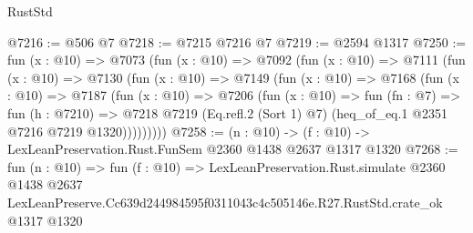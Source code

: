 \begin{lexlean}{RustStd}
\begin{coremodule}
@7216 := @506 @7
@7218 := @7215 @7216 @7
@7219 := @2594 @1317
@7250 := fun (x : @10) =>
  @7073
    (fun (x : @10) =>
    @7092
      (fun (x : @10) =>
      @7111
        (fun (x : @10) =>
        @7130
          (fun (x : @10) =>
          @7149
            (fun (x : @10) =>
            @7168
              (fun (x : @10) =>
              @7187
                (fun (x : @10) =>
                @7206
                  (fun (x : @10) =>
                  fun (fn : @7) =>
                  fun (h : @7210) =>
                  @7218
                    @7219
                    (Eq.refl.{2} (Sort 1) @7)
                    (heq_of_eq.{1} @2351 @7216 @7219 @1320)))))))))
@7258 := (n : @10) -> (f : @10) -> LexLeanPreservation.Rust.FunSem @2360 @1438 @2637 @1317 @1320
@7268 := fun (n : @10) =>
  fun (f : @10) =>
  LexLeanPreservation.Rust.simulate
    @2360
    @1438
    @2637
    LexLeanPreserve.Cc639d244984595f0311043c4c505146e.R27.RustStd.crate_ok
    @1317
    @1320
\end{coremodule}
\end{lexlean}
